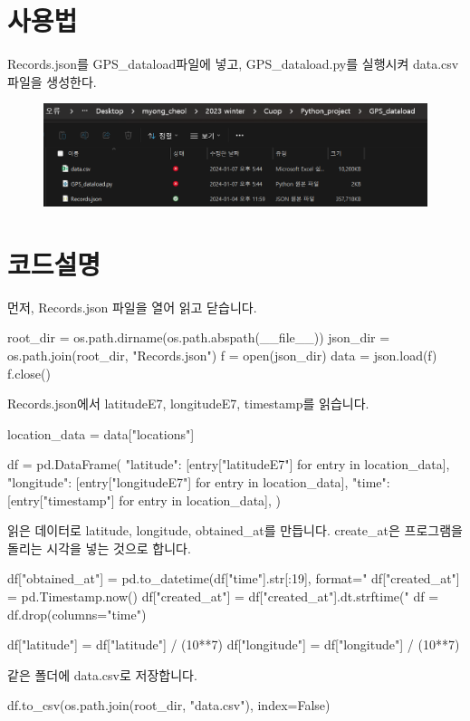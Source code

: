 \documentclass{oblivoir}
\begin{document}
  \section{사용법}
  Records.json를 GPS\_dataload파일에 넣고, GPS\_dataload.py를 실행시켜 data.csv파일을 생성한다.
  \begin{figure}[H]
    \includegraphics[width=\textwidth]{Google_takeout_9.png}
  \end{figure}

  \section{코드설명}
  먼저, Records.json 파일을 열어 읽고 닫습니다.
  \begin{python}[label={GPS_dataload_1}]
    root_dir = os.path.dirname(os.path.abspath(__file__))
    json_dir = os.path.join(root_dir, "Records.json")
    f = open(json_dir)
    data = json.load(f)
    f.close()
  \end{python}
  Records.json에서 latitudeE7, longitudeE7, timestamp를 읽습니다.
  \begin{python}[label={GPS_dataload_1}]
    location_data = data["locations"]

    df = pd.DataFrame(
        {
            "latitude": [entry["latitudeE7"] for entry in location_data],
            "longitude": [entry["longitudeE7"] for entry in location_data],
            "time": [entry["timestamp"] for entry in location_data],
        }
    )
  \end{python}
  읽은 데이터로 latitude, longitude, obtained\_at를 만듭니다. create\_at은 프로그램을 돌리는 시각을 넣는 것으로 합니다.
  \begin{python}[label={GPS_dataload_3}]
    df["obtained_at"] = pd.to_datetime(df["time"].str[:19], format="%
    df["created_at"] = pd.Timestamp.now()
    df["created_at"] = df["created_at"].dt.strftime("%
    df = df.drop(columns="time")

    df["latitude"] = df["latitude"] / (10**7)
    df["longitude"] = df["longitude"] / (10**7)    
  \end{python}
  같은 폴더에 data.csv로 저장합니다.
  \begin{python}[label=GPS_dataload_4]
    df.to_csv(os.path.join(root_dir, "data.csv"), index=False)
  \end{python}
\end{document}
